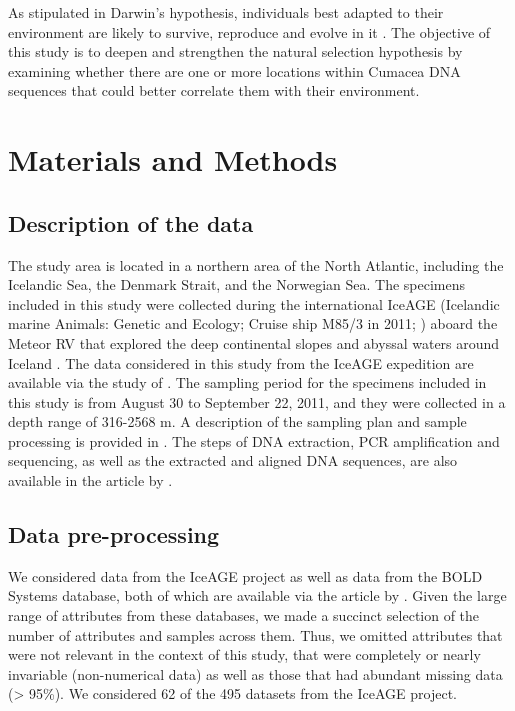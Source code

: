 As stipulated in Darwin's hypothesis, individuals best adapted to their environment are likely to survive, reproduce and evolve in it \citep{darwin_origin_1859}. The objective of this study is to deepen and strengthen the natural selection hypothesis by examining whether there are one or more locations within Cumacea DNA sequences that could better correlate them with their environment.


\section{Materials and Methods}\label{materials-methods}

\subsection{Description of the data}
The study area is located in a northern area of the North Atlantic, including the Icelandic Sea, the Denmark Strait, and the Norwegian Sea. The specimens included in this study were collected during the international IceAGE (Icelandic marine Animals: Genetic and Ecology; Cruise ship M85/3 in 2011; \citep{brix_iceage_2014, meisner_prefacebiodiversity_2018}) aboard the Meteor RV that explored the deep continental slopes and abyssal waters around Iceland \citep{meisner_prefacebiodiversity_2018}. The data considered in this study from the IceAGE expedition are available via the study of \cite{uhlir_adding_2021}. The sampling period for the specimens included in this study is from August 30 to September 22, 2011, and they were collected in a depth range of 316-2568 m. A description of the sampling plan and sample processing is provided in \cite{uhlir_adding_2021}. The steps of DNA extraction, PCR amplification and sequencing, as well as the extracted and aligned DNA sequences, are also available in the article by \cite{uhlir_adding_2021}.

\subsection{Data pre-processing}
We considered data from the IceAGE project as well as data from the BOLD Systems database, both of which are available via the article by \cite{uhlir_adding_2021}. Given the large range of attributes from these databases, we made a succinct selection of the number of attributes and samples across them. Thus, we omitted attributes that were not relevant in the context of this study, that were completely or nearly invariable (non-numerical data) as well as those that had abundant missing data (> 95\%). We considered 62 of the 495 datasets from the IceAGE project.

